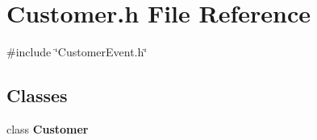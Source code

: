 \section{Customer.\+h File Reference}
\label{Customer_8h}
{\ttfamily \#include \char`\"{}Customer\+Event.\+h\char`\"{}}\newline
\subsection*{Classes}
\begin{DoxyCompactItemize}
\item 
class \textbf{ Customer}
\end{DoxyCompactItemize}
